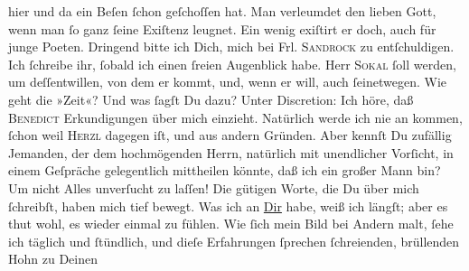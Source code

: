 \begin{ledgroupsized}[t]{13cm}
               hier und da ein Beſen ſchon geſchoſſen hat. Man 
               verleumdet den lieben Gott, wenn man ſo ganz ſeine Exiſtenz leugnet. Ein wenig
               exiſtirt er doch, auch für junge Poeten.\pend
           \pstart
           Dringend bitte ich Dich, mich bei Frl. \textsc{Sandrock} zu entſchuldigen. Ich ſchreibe ihr, ſobald ich einen ſreien Augenblick
               habe.\pend
           \pstart
           Herr \textsc{Sokal} ſoll \label{K_L02622-8v}\label{K_L02622-8h} werden, {\pb}um deſſentwillen, von dem er kommt, und, wenn er
               will, auch ſeinetwegen.\pend
           \pstart
           Wie geht die »Zeit«? Und was ſagſt Du dazu?\pend
           \pstart
           Unter Discretion: Ich höre, daß \textsc{Benedict} Erkundigungen über mich einzieht. Natürlich werde ich nie an \label{K_L02622-9v}\label{K_L02622-9h} kommen, ſchon weil \textsc{Herzl} dagegen iſt, und aus andern Gründen. Aber kennſt Du zufällig Jemanden, der dem
               hochmögenden Herrn, natürlich mit unendlicher
               Vorſicht, in einem Geſpräche gelegentlich mittheilen könnte, {\pb}daß ich ein großer Mann bin? Um nicht Alles
               unverſucht zu laſſen!\pend
           \pstart
           Die gütigen Worte, die Du über mich ſchreibſt, haben mich tief bewegt. Was ich an \uline{Dir} habe, weiß ich längſt; aber es thut wohl, es
               wieder einmal zu fühlen. Wie ſich mein Bild bei Andern malt, ſehe ich täglich und
               ſtündlich, und dieſe Erfahrungen ſprechen ſchreienden, brüllenden Hohn zu Deinen

\end{ledgroupsized}
